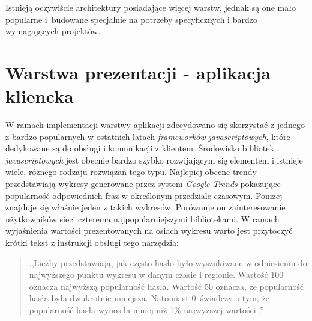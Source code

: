  
\noindent Istnieją oczywiście architektury posiadające więcej warstw, jednak są one mało popularne i~budowane specjalnie na potrzeby specyficznych i bardzo wymagających projektów.


\section{Warstwa prezentacji - aplikacja kliencka}
\quad W ramach implementacji warstwy aplikacji zdecydowano się skorzystać z jednego z bardzo popularnych w ostatnich latach \textit{frameworków javascriptowych}, które dedykowane są do obsługi i komunikacji z klientem. Środowisko bibliotek \textit{javascriptowych} jest obecnie bardzo szybko rozwijającym się elementem i istnieje wiele, różnego rodzaju rozwiązań tego typu. Najlepiej obecne trendy przedstawiają wykresy generowane przez system \textit{Google Trends} pokazujące popularność odpowiednich fraz w określonym przedziale czasowym. Poniżej znajduje się właśnie jeden z takich wykresów. Porównuje on zainteresowanie użytkowników sieci czterema najpopularniejszymi bibliotekami. W ramach wyjaśnienia wartości prezentowanych na osiach wykresu warto jest przytoczyć krótki tekst z instrukcji obsługi tego narzędzia:\\
\begin{quote}
    \item,,Liczby przedstawiają, jak często hasło było wyszukiwane w odniesieniu do najwyższego punktu wykresu w danym czasie i regionie. Wartość 100 oznacza najwyższą popularność hasła. Wartość 50 oznacza, że popularność hasła była dwukrotnie mniejsza. Natomiast 0~świadczy o tym, że popularność hasła wynosiła mniej niż 1\% najwyższej wartości \cite{google-trends}.'' 
\end{quote}

